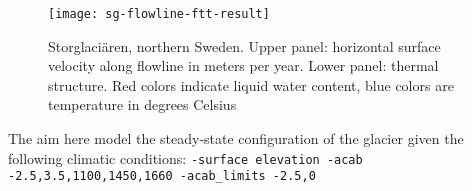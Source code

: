 \begin{figure}[ht]
  \centering
  \texttt{[image: sg-flowline-ftt-result]}
  \caption{Storglaci{\"a}ren, northern Sweden. Upper panel: horizontal surface velocity along flowline in meters per year. Lower panel: thermal structure. Red colors indicate liquid water content, blue colors are temperature in degrees Celsius}
  \label{fig:storglaciaren}
\end{figure}


The aim here model the steady-state configuration of the glacier given the following climatic conditions: \texttt{-surface elevation -acab -2.5,3.5,1100,1450,1660 -acab_limits -2.5,0}
